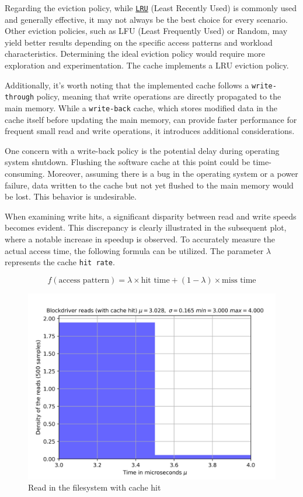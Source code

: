 Regarding the eviction policy, while \href{https://en.wikipedia.org/wiki/Cache_replacement_policies}{\texttt{LRU}} (Least Recently Used) is commonly used and generally effective, it may not always be the best choice for every scenario. Other eviction policies, such as LFU (Least Frequently Used) or Random, may yield better results depending on the specific access patterns and workload characteristics. Determining the ideal eviction policy would require more exploration and experimentation. The cache implements a LRU eviction policy.

Additionally, it's worth noting that the implemented cache follows a \texttt{write-through} policy, meaning that write operations are directly propagated to the main memory. While a \texttt{write-back} cache, which stores modified data in the cache itself before updating the main memory, can provide faster performance for frequent small read and write operations, it introduces additional considerations.

One concern with a write-back policy is the potential delay during operating system shutdown. Flushing the software cache at this point could be time-consuming. Moreover, assuming there is a bug in the operating system or a power failure, data written to the cache but not yet flushed to the main memory would be lost. This behavior is undesirable.

When examining write hits, a significant disparity between read and write speeds becomes evident. This discrepancy is clearly illustrated in the subsequent plot, where a notable increase in speedup is observed. To accurately measure the actual access time, the following formula can be utilized. The parameter $\lambda$ represents the cache \texttt{hit rate}.

\[ f(\text{{access pattern}}) = \lambda \times \text{{hit time}} + (1 - \lambda) \times \text{{miss time}} \]



\begin{figure}[htp]
    \centering
    \includegraphics[width=12cm]{images/filesystem/benchmark_read_cache.jpg}
    \caption{Read in the filesystem with cache hit}
    \label{fig:galaxy}
\end{figure}


